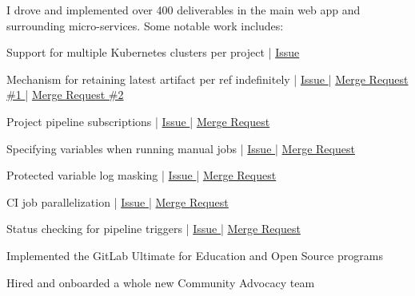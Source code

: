 \documentclass[]{matija-resume}
\begin{document}
\begin{minipage}[t]{1.0\textwidth}
\vspace{\topsep}
I drove and implemented over 400 deliverables in the main web app and surrounding micro-services. Some notable work includes:
\vspace{\topsep}
\begin{tightemize}
\item Support for multiple Kubernetes clusters per project | \href{https://gitlab.com/gitlab-org/gitlab/-/issues/3734}{Issue }
\item Mechanism for retaining latest artifact per ref indefinitely | \href{https://gitlab.com/gitlab-org/gitlab/-/issues/16267}{Issue } | \href{https://gitlab.com/gitlab-org/gitlab/-/merge_requests/29802}{Merge Request \#1 } | \href{https://gitlab.com/gitlab-org/gitlab/-/merge_requests/30741}{Merge Request \#2 }
\item Project pipeline subscriptions | \href{https://gitlab.com/gitlab-org/gitlab/-/issues/9045}{Issue } | \href{https://gitlab.com/gitlab-org/gitlab/-/merge_requests/20063}{Merge Request }
\item Specifying variables when running manual jobs | \href{https://gitlab.com/gitlab-org/gitlab-foss/-/issues/24935}{Issue } | \href{https://gitlab.com/gitlab-org/gitlab-foss/-/merge_requests/30485}{Merge Request }
\item Protected variable log masking | \href{https://gitlab.com/gitlab-org/gitlab-foss/-/issues/13784}{Issue } | \href{hhttps://gitlab.com/gitlab-org/gitlab-foss/-/merge_requests/25293}{Merge Request }
\item CI job parallelization | \href{https://gitlab.com/gitlab-org/gitlab-foss/-/issues/21480}{Issue } | \href{https://gitlab.com/gitlab-org/gitlab-foss/-/merge_requests/22631}{Merge Request }
\item Status checking for pipeline triggers | \href{https://gitlab.com/gitlab-org/gitlab/-/issues/11238}{Issue } | \href{https://gitlab.com/gitlab-org/gitlab/-/merge_requests/15580}{Merge Request }
\end{tightemize}
\sectionsep

\begin{tightemize}
\item Implemented the GitLab Ultimate for Education and Open Source programs
\item Hired and onboarded a whole new Community Advocacy team
\end{tightemize}
\sectionsep


\end{minipage}
\end{document}

